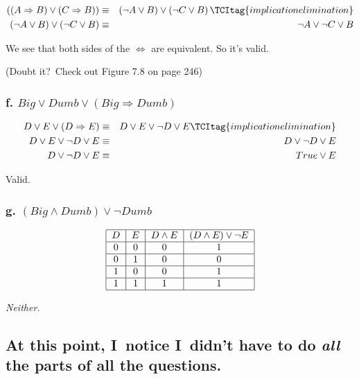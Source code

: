 \documentclass{article}
\begin{document}
\begin{eqnarray}
\left( \left( A\Rightarrow B\right) \vee \left( C\Rightarrow B\right)
\right) &\equiv &\left( \lnot A\vee B\right) \vee \left( \lnot C\vee B\right)
\TCItag{implication elimination} \\
\left( \lnot A\vee B\right) \vee \left( \lnot C\vee B\right) &\equiv &\lnot
A\vee \lnot C\vee B  \nonumber
\end{eqnarray}

We see that both sides of the $\Leftrightarrow $ are equivalent. So it's
valid.

(Doubt it?\ Check out Figure 7.8 on page 246)

\subsubsection{f. $Big\vee Dumb\vee \left( Big\Rightarrow Dumb\right) $}

\begin{eqnarray}
D\vee E\vee \left( D\Rightarrow E\right) &\equiv &D\vee E\vee \lnot D\vee E 
\TCItag{implication elimination} \\
D\vee E\vee \lnot D\vee E &\equiv &D\vee \lnot D\vee E  \nonumber \\
D\vee \lnot D\vee E &\equiv &True\vee E  \nonumber
\end{eqnarray}

Valid.

\subsubsection{g. $\left( Big\wedge Dumb\right) \vee \lnot Dumb$}

\[
\begin{tabular}{|c|c|c|c|}
\hline
$D$ & $E$ & $D\wedge E$ & $\left( D\wedge E\right) \vee \lnot E$ \\ \hline
0 & 0 & 0 & 1 \\ \hline
0 & 1 & 0 & 0 \\ \hline
1 & 0 & 0 & 1 \\ \hline
1 & 1 & 1 & 1 \\ \hline
\end{tabular}%
\]

\textit{Neither.}

\subsection{At this point, I\ notice I\ didn't have to do \textit{all} the
parts of all the questions.}
\end{document}
